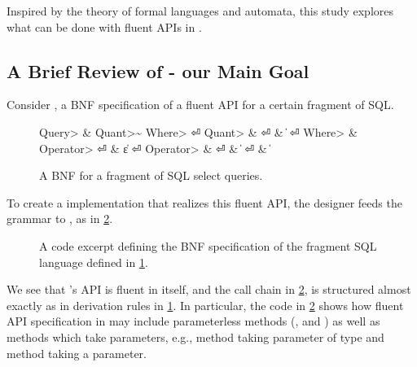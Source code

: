 Inspired by the theory of formal languages and automata,
  this study explores what can be done with fluent APIs in \Java.

\subsection{A Brief Review of \texorpdfstring{\Fajita}{Fajita} - our Main Goal}
Consider , a BNF specification of a fluent API for a certain
fragment of SQL.

\begin{figure}[H]
  \caption{\label{figure:sql-bnf}
    A BNF for a fragment of SQL select queries.
  }
  \begin{Grammar}
    \begin{aligned}
      \<Query> & \Derives {} \<Quant>\~ \<Where> \hfill⏎
      \<Quant> & \Derives {} \hfill⏎
                  & \|  \hfill⏎
      \<Where> & \Derives {}  \<Operator> \hfill⏎
                  & \|ε \hfill⏎
      \<Operator> & \Derives {}\hfill⏎
                  & \|  \hfill⏎
                  & \| \hfill
    \end{aligned}
  \end{Grammar}
\end{figure}

To create a \Java implementation that realizes this fluent API,
  the designer feeds the grammar to \Fajita, as in
  \cref{figure:sql-bnf-java}.

\begin{figure}[H]
  \caption{\label{figure:sql-bnf-java}
    A \Java code excerpt defining the BNF specification of the fragment SQL
    language defined in \cref{figure:sql-bnf}.}
\end{figure}

We see that \Fajita's API is fluent in itself, and the
  call chain in \cref{figure:sql-bnf-java}, is structured almost
  exactly as in derivation rules in \cref{figure:sql-bnf}.
In particular, the code in \cref{figure:sql-bnf-java} shows how fluent API specification in \Fajita
  may include parameterless methods (,  and ) as well as methods which
  take parameters, e.g., method  taking parameter of type  and
    method  taking a  parameter.


